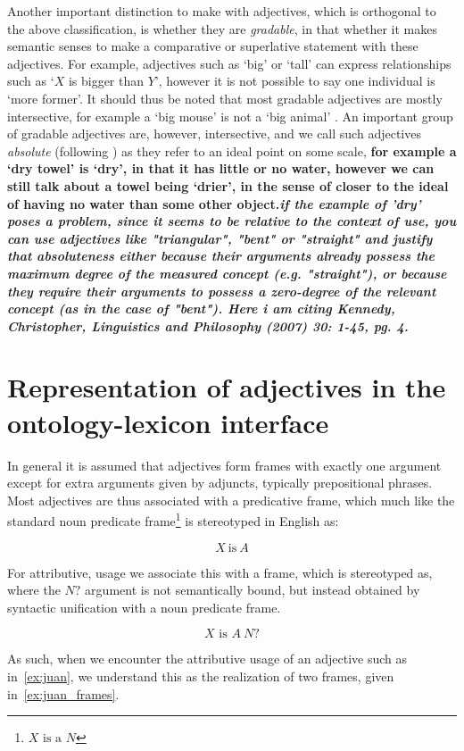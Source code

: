 \documentclass[11pt]{article}
\begin{document}
Another important distinction to make with adjectives, which is orthogonal to the above classification, 
is whether they are \emph{gradable}, in that whether it makes semantic senses to make a comparative 
or superlative statement with these adjectives. For example, adjectives such as 
`big' or `tall' can express relationships such as `$X$ is bigger than $Y$', 
however it is not possible to say one individual is `more former'. It should thus be noted that most gradable adjectives are mostly intersective,
for example a `big mouse' is not a `big animal' \cite{morzycki2013modification}.
An important group of gradable adjectives are, however, intersective, and we call 
such adjectives \emph{absolute} (following \cite{rusiecki1985adjectives}) as they 
refer to an ideal point on some scale, \textbf{for example a `dry towel' is `dry', in 
that it has little or no water, however we can still talk about a towel being 
`drier', in the sense of closer to the ideal of having no water than some other 
object.\textit{if the example of 'dry' poses a problem, since it seems to  be relative to the context of use, you can use adjectives like "triangular", "bent" or "straight" and justify that absoluteness either because their arguments already possess the maximum degree of the measured concept (e.g. "straight"), or because they require their arguments to possess a zero-degree of the relevant concept (as in the case of "bent"). Here i am citing Kennedy, Christopher, Linguistics and Philosophy (2007) 30: 1-45, pg. 4.}}


\section{Representation of adjectives in the ontology-lexicon interface}

In general it is assumed that adjectives form frames with exactly one argument 
except for extra arguments given by adjuncts, typically prepositional phrases. 
Most adjectives are thus associated with a predicative frame, which much
like the standard noun predicate frame\footnote{$X\text{ is a }N$} is stereotyped in English as:

$$X\mathrm{~is~}A$$

For attributive, usage we associate this with a frame, which is stereotyped as,
where the $N?$ argument is not semantically bound, but instead obtained by
syntactic unification with a noun predicate frame.

$$X\text{ is }A~N?$$

As such, when we encounter the attributive usage of an adjective such as in~\ref{ex:juan}, 
we understand this as the realization of two frames, given in~\ref{ex:juan_frames}.
\end{document}
